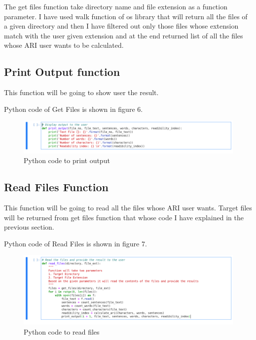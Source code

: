 \documentclass{article}
\begin{document}
The get files function take directory name and file extension as a function parameter. I have used walk function of os library that will return all the files of a given directory and then I have filtered out only those files whose extension match with the user given extension and at the end returned list of all the files whose ARI user wants to be calculated.


\subsection{Print Output function}
This function will be going to show user the result. 

Python code of Get Files is shown in figure 6.

\begin{figure}
\centering
\includegraphics[scale=0.2]{screenshots/ai_a1-6.png}
\caption{\label{fig:python_code_print_output}Python code to print output}
\end{figure}



\subsection{Read Files Function}
This function will be going to read all the files whose ARI user wants. Target files will be returned from get files function that whose code I have explained in the previous section.

Python code of Read Files is shown in figure 7.

\begin{figure}
\centering
\includegraphics[scale=0.2]{screenshots/ai_a1-7.png}
\caption{\label{fig:python_code_read_files}Python code to read files}
\end{figure}
\end{document}
